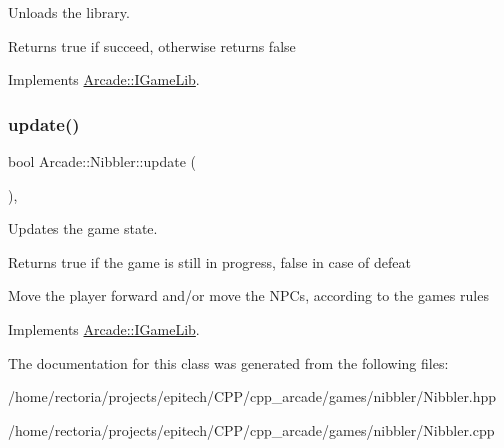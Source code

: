 Unloads the library. 

\begin{DoxyReturn}{Returns}
true if succeed, otherwise returns false 
\end{DoxyReturn}


Implements \hyperlink{class_arcade_1_1_i_game_lib_ab9b7c1bbbea1b86e8515e8fd188fe9cb}{Arcade\+::\+I\+Game\+Lib}.

\mbox{\label{class_arcade_1_1_nibbler_a13199140bc927065b1c59ae2c70e06cf}} 
\subsubsection{\texorpdfstring{update()}{update()}}
{\footnotesize\ttfamily bool Arcade\+::\+Nibbler\+::update (\begin{DoxyParamCaption}{ }\end{DoxyParamCaption})\hspace{0.3cm}{\ttfamily [final]}, {\ttfamily [virtual]}}



Updates the game state. 

\begin{DoxyReturn}{Returns}
true if the game is still in progress, false in case of defeat
\end{DoxyReturn}
Move the player forward and/or move the N\+P\+Cs, according to the game\textquotesingle{}s rules 

Implements \hyperlink{class_arcade_1_1_i_game_lib_a0be7ffaa269e2fa47146bf27ad2c511a}{Arcade\+::\+I\+Game\+Lib}.



The documentation for this class was generated from the following files\+:\begin{DoxyCompactItemize}
\item 
/home/rectoria/projects/epitech/\+C\+P\+P/cpp\+\_\+arcade/games/nibbler/Nibbler.\+hpp\item 
/home/rectoria/projects/epitech/\+C\+P\+P/cpp\+\_\+arcade/games/nibbler/Nibbler.\+cpp\end{DoxyCompactItemize}
